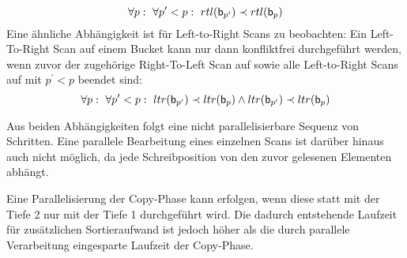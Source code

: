 \[\forall p:~\forall p^\prime < p:~rtl(\mathsf{b}_{p^\prime}) \prec rtl(\mathsf{b}_{p})\]
Eine ähnliche Abhängigkeit ist für Left-to-Right Scans zu beobachten: Ein Left-To-Right Scan  auf einem Bucket  kann nur dann konfliktfrei durchgeführt werden, wenn zuvor der zugehörige Right-To-Left Scan auf  sowie alle Left-to-Right Scans auf  mit \(p^\prime < p\) beendet sind:
\[\forall p:~\forall p^\prime < p:~ltr(\mathsf{b}_{p^\prime}) \prec ltr(\mathsf{b}_{p}) \wedge ltr(\mathsf{b}_{p^\prime}) \prec ltr(\mathsf{b}_{p})\]\par
Aus beiden Abhängigkeiten folgt eine nicht parallelisierbare Sequenz von Schritten. Eine parallele Bearbeitung eines einzelnen Scans ist darüber hinaus auch nicht möglich, da jede Schreibposition von den zuvor gelesenen Elementen abhängt.\par\medskip
Eine Parallelisierung der Copy-Phase kann erfolgen, wenn diese statt mit der Tiefe 2 nur mit der Tiefe 1 durchgeführt wird. Die dadurch entstehende Laufzeit für zusätzlichen Sortieraufwand ist jedoch höher als die durch parallele Verarbeitung eingesparte Laufzeit der Copy-Phase.

